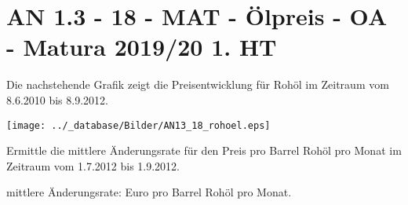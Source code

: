 \section{AN 1.3 - 18 - MAT - Ölpreis - OA - Matura 2019/20 1. HT}

\begin{beispiel}[AN 1.3]{1}
Die nachstehende Grafik zeigt die Preisentwicklung für Rohöl im Zeitraum vom 8.6.2010 bis 8.9.2012.

\texttt{[image: ../\_database/Bilder/AN13\_18\_rohoel.eps]}

Ermittle die mittlere Änderungsrate für den Preis pro Barrel Rohöl pro Monat im Zeitraum vom 1.7.2012 bis 1.9.2012.

mittlere Änderungsrate:\,\,Euro pro Barrel Rohöl pro Monat.

\end{beispiel}